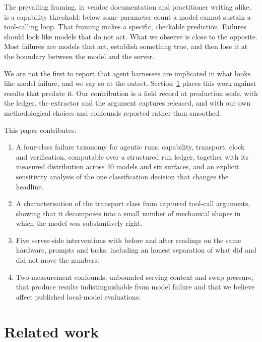 \documentclass[11pt]{article}
\begin{document}
The prevailing framing, in vendor documentation and practitioner writing alike, is a capability threshold: below
some parameter count a model cannot sustain a tool-calling loop. That framing makes a specific, checkable
prediction. Failures should look like models that do not act. What we observe is close to the opposite. Most
failures are models that act, establish something true, and then lose it at the boundary between the model and
the server.

We are not the first to report that agent harnesses are implicated in what looks like model failure, and we say
so at the outset. Section~\ref{sec:related} places this work against results that predate it. Our contribution
is a field record at production scale, with the ledger, the extractor and the argument captures released, and
with our own methodological choices and confounds reported rather than smoothed.

This paper contributes:

\begin{enumerate}
\item A four-class failure taxonomy for agentic runs, capability, transport, clock and verification, computable
over a structured run ledger, together with its measured distribution across 40 models and six surfaces, and an
explicit sensitivity analysis of the one classification decision that changes the headline.
\item A characterisation of the transport class from captured tool-call arguments, showing that it decomposes
into a small number of mechanical shapes in which the model was substantively right.
\item Five server-side interventions with before and after readings on the same hardware, prompts and tasks,
including an honest separation of what did and did not move the numbers.
\item Two measurement confounds, unbounded serving context and swap pressure, that produce results
indistinguishable from model failure and that we believe affect published local-model evaluations.
\end{enumerate}

\section{Related work}
\label{sec:related}
\end{document}
